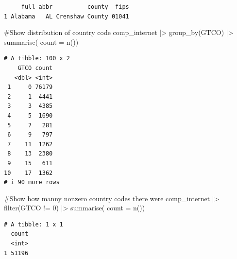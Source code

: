 \documentclass[
  letterpaper,
  DIV=11,
  numbers=noendperiod]{scrartcl}
\newenvironment{Shaded}{\begin{snugshade}}{\end{snugshade}}
\newcommand{\AttributeTok}[1]{\textcolor[rgb]{0.40,0.45,0.13}{#1}}
\newcommand{\CommentTok}[1]{\textcolor[rgb]{0.37,0.37,0.37}{#1}}
\newcommand{\DecValTok}[1]{\textcolor[rgb]{0.68,0.00,0.00}{#1}}
\newcommand{\FunctionTok}[1]{\textcolor[rgb]{0.28,0.35,0.67}{#1}}
\newcommand{\NormalTok}[1]{\textcolor[rgb]{0.00,0.23,0.31}{#1}}
\newcommand{\SpecialCharTok}[1]{\textcolor[rgb]{0.37,0.37,0.37}{#1}}
\begin{document}
\begin{verbatim}
     full abbr          county  fips
1 Alabama   AL Crenshaw County 01041
\end{verbatim}

\begin{Shaded}
\begin{Highlighting}[]
\CommentTok{\#Show distribution of country code}
\NormalTok{comp\_internet }\SpecialCharTok{|\textgreater{}}
  \FunctionTok{group\_by}\NormalTok{(GTCO) }\SpecialCharTok{|\textgreater{}}
  \FunctionTok{summarise}\NormalTok{( }\AttributeTok{count =} \FunctionTok{n}\NormalTok{())}
\end{Highlighting}
\end{Shaded}

\begin{verbatim}
# A tibble: 100 x 2
    GTCO count
   <dbl> <int>
 1     0 76179
 2     1  4441
 3     3  4385
 4     5  1690
 5     7   281
 6     9   797
 7    11  1262
 8    13  2380
 9    15   611
10    17  1362
# i 90 more rows
\end{verbatim}

\begin{Shaded}
\begin{Highlighting}[]
\CommentTok{\#Show how manny nonzero country codes there were}
\NormalTok{comp\_internet }\SpecialCharTok{|\textgreater{}}
  \FunctionTok{filter}\NormalTok{(GTCO }\SpecialCharTok{!=} \DecValTok{0}\NormalTok{) }\SpecialCharTok{|\textgreater{}}
  \FunctionTok{summarise}\NormalTok{( }\AttributeTok{count =} \FunctionTok{n}\NormalTok{())}
\end{Highlighting}
\end{Shaded}

\begin{verbatim}
# A tibble: 1 x 1
  count
  <int>
1 51196
\end{verbatim}
\end{document}
